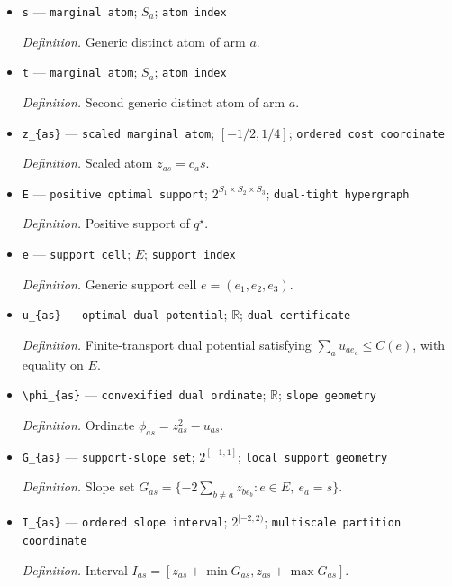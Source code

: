 \documentclass{article}
\begin{document}
\begin{itemize}
  \item \texttt{s} --- \texttt{marginal atom}; \(S_a\); \texttt{atom index}
  \par\smallskip\noindent\emph{Definition.} Generic distinct atom of arm \(a\).
  \item \texttt{t} --- \texttt{marginal atom}; \(S_a\); \texttt{atom index}
  \par\smallskip\noindent\emph{Definition.} Second generic distinct atom of arm \(a\).
  \item \texttt{z\_\allowbreak{}\{as\}\allowbreak{}} --- \texttt{scaled marginal atom}; \([-1/2,1/4]\); \texttt{ordered cost coordinate}
  \par\smallskip\noindent\emph{Definition.} Scaled atom \(z_{as}=c_as\).
  \item \texttt{E} --- \texttt{positive optimal support}; \(2^{S_1\times S_2\times S_3}\); \texttt{dual-\allowbreak{}tight hypergraph}
  \par\smallskip\noindent\emph{Definition.} Positive support of \(q^\star\).
  \item \texttt{e} --- \texttt{support cell}; \(E\); \texttt{support index}
  \par\smallskip\noindent\emph{Definition.} Generic support cell \(e=(e_1,e_2,e_3)\).
  \item \texttt{u\_\allowbreak{}\{as\}\allowbreak{}} --- \texttt{optimal dual potential}; \(\mathbb R\); \texttt{dual certificate}
  \par\smallskip\noindent\emph{Definition.} Finite-transport dual potential satisfying \(\sum_a u_{ae_a}\le C(e)\), with equality on \(E\).
  \item \texttt{\textbackslash{}\allowbreak{}phi\_\allowbreak{}\{as\}\allowbreak{}} --- \texttt{convexified dual ordinate}; \(\mathbb R\); \texttt{slope geometry}
  \par\smallskip\noindent\emph{Definition.} Ordinate \(\phi_{as}=z_{as}^2-u_{as}\).
  \item \texttt{G\_\allowbreak{}\{as\}\allowbreak{}} --- \texttt{support-\allowbreak{}slope set}; \(2^{[-1,1]}\); \texttt{local support geometry}
  \par\smallskip\noindent\emph{Definition.} Slope set \(G_{as}=\{-2\sum_{b\ne a}z_{be_b}:e\in E,\ e_a=s\}\).
  \item \texttt{I\_\allowbreak{}\{as\}\allowbreak{}} --- \texttt{ordered slope interval}; \(2^{[-2,2)}\); \texttt{multiscale partition coordinate}
  \par\smallskip\noindent\emph{Definition.} Interval \(I_{as}=[z_{as}+\min G_{as},z_{as}+\max G_{as}]\).

\end{itemize}
\end{document}
